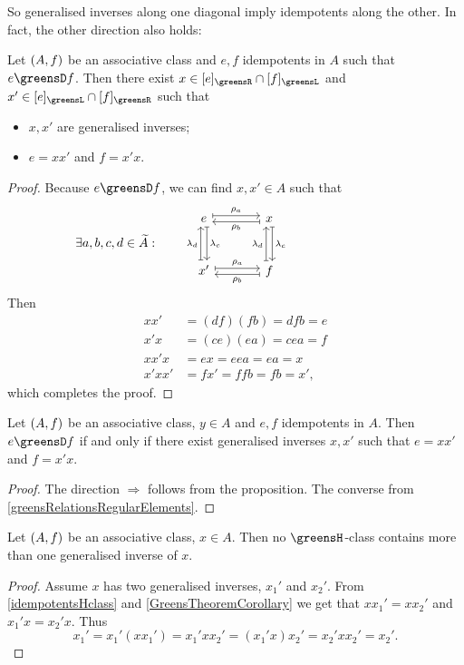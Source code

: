 So generalised inverses along one diagonal imply idempotents along the other. In fact, the other direction also holds:
\begin{proposition}
Let $\left( A, f \right)$ be an associative class and $e,f$ idempotents in $A$ such that $e\greensD f$. Then there exist $x\in [e]_\greensR\cap [f]_\greensL$ and $x'\in [e]_\greensL\cap [f]_\greensR$ such that
\begin{itemize}
\item $x,x'$ are generalised inverses;
\item $e = xx'$ and $f = x'x$.
\end{itemize}
\end{proposition}
\begin{proof}
Because $e\greensD f$, we can find $x,x'\in A$ such that
\[ \hspace{-8.4em} \exists a,b,c,d \in \widetilde{A}: \qquad \begin{tikzcd}[sep=large]
e \ar[r, maps to, shift left, "\rho_a"] \ar[d, maps to, shift left, "\lambda_c"] & x \ar[l, maps to, shift left, "\rho_b"] \ar[d, maps to, shift left, "\lambda_c"] \\
x' \ar[u, maps to, shift left, "\lambda_d"] \ar[r, maps to, shift left, "\rho_a"] & f \ar[u, maps to, shift left, "\lambda_d"] \ar[l, maps to, shift left, "\rho_b"]
\end{tikzcd} \]
Then
\begin{align*}
xx' &= (df)(fb) = dfb = e \\
x'x &= (ce)(ea) = cea = f \\
xx'x &= ex = eea = ea = x \\
x'xx' &= fx' = ffb = fb = x',
\end{align*}
which completes the proof.
\end{proof}
\begin{corollary}
Let $\left( A, f \right)$ be an associative class, $y\in A$ and $e,f$ idempotents in $A$. Then $e\greensD f$ \textup{if and only if} there exist generalised inverses $x,x'$ such that $e = xx'$ and $f = x'x$.
\end{corollary}
\begin{proof}
The direction $\Rightarrow$ follows from the proposition. The converse from \ref{greensRelationsRegularElements}.
\end{proof}

\begin{lemma}
Let $\left( A, f \right)$ be an associative class, $x\in A$. Then no $\greensH$-class contains more than one generalised inverse of $x$.
\end{lemma}
\begin{proof}
Assume $x$ has two generalised inverses, $x_1'$ and $x_2'$. From \ref{idempotentsHclass} and \ref{GreensTheoremCorollary} we get that $xx_1' = xx_2'$ and $x_1'x = x_2'x$. Thus
\[ x_1' = x_1'(xx_1') = x_1'xx_2' = (x_1'x)x_2' =  x_2'xx_2' = x_2'. \]
\end{proof}


